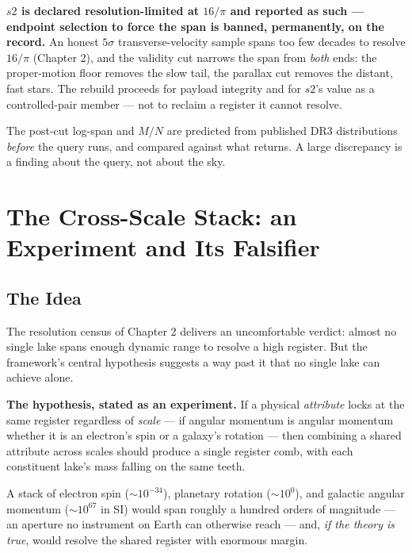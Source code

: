 \documentclass[11pt, letterpaper, openany]{book}
\newcommand{\MN}{M/N}
\begin{document}
\begin{rulingbox}
\textbf{$s2$ is declared resolution-limited at $16/\pi$ and reported as such --- endpoint selection
to force the span is banned, permanently, on the record.} An honest $5\sigma$ transverse-velocity
sample spans too few decades to resolve $16/\pi$ (Chapter 2), and the validity cut narrows the span
from \emph{both} ends: the proper-motion floor removes the slow tail, the parallax cut removes the
distant, fast stars. The rebuild proceeds for payload integrity and for $s2$'s value as a
controlled-pair member --- not to reclaim a register it cannot resolve.

\medskip
\noindent The post-cut log-span and $\MN$ are predicted from published DR3 distributions
\emph{before} the query runs, and compared against what returns. A large discrepancy is a finding
about the query, not about the sky.
\end{rulingbox}

\chapter{The Cross-Scale Stack: an Experiment and Its Falsifier}

\section{The Idea}

The resolution census of Chapter 2 delivers an uncomfortable verdict: almost no single lake spans
enough dynamic range to resolve a high register. But the framework's central hypothesis suggests a
way past it that no single lake can achieve alone.

\begin{signalbox}
\textbf{The hypothesis, stated as an experiment.} If a physical \emph{attribute} locks at the same
register regardless of \emph{scale} --- if angular momentum is angular momentum whether it is an
electron's spin or a galaxy's rotation --- then combining a shared attribute across scales should
produce a single register comb, with each constituent lake's mass falling on the same teeth.

\medskip
\noindent A stack of electron spin ($\sim 10^{-34}$), planetary rotation ($\sim 10^{0}$), and
galactic angular momentum ($\sim 10^{67}$ in SI) would span roughly a hundred orders of magnitude
--- an aperture no instrument on Earth can otherwise reach --- and, \emph{if the theory is true},
would resolve the shared register with enormous margin.
\end{signalbox}
\end{document}
